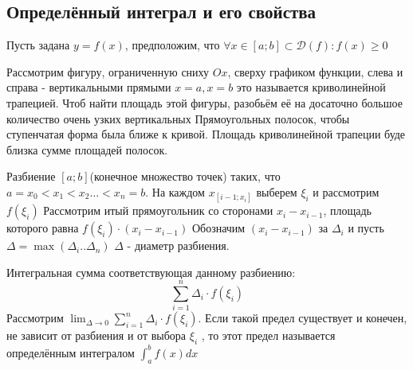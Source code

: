 \documentclass[oneside]{book}
\begin{document}
\begin{itemize}
\begin{enumerate}
\setcounter{chapter}{34} %
\chapter[Определённый интеграл]{Определённый интеграл и его свойства}
Пусть задана $y = f(x)$, предположим, что $\forall x \in [a;b] \subset \mathcal{D}(f): f(x) \geq 0$
\begin{center}
   {\pgfqpoint{-1pt}{-1pt}}%
   {\pgfqpoint{10pt}{10pt}}%
   {\pgfqpoint{9pt}{9pt}}%
   {
     \pgfsetlinewidth{0.4pt}
     \pgfpathmoveto{\pgfqpoint{0pt}{0pt}}
     \pgfpathlineto{\pgfqpoint{9.1pt}{9.1pt}}
    }
    \end{center}

Рассмотрим фигуру, ограниченную сниху $Ox$, сверху графиком функции, слева и справа - вертикальными прямыми
$x = a, x = b$ это называется криволинейной трапецией. Чтоб найти площадь этой фигуры, разобьём её на досаточно
большое количество очень узких вертикальных Прямоугольных полосок, чтобы ступенчатая форма была ближе к кривой. Площадь криволинейной
трапеции буде близка сумме площадей полосок.
\par Разбиение $[a;b]$(конечное множество точек) таких, что $a = x_0 <x_1 < x_2 \dots < x_n = b$. На каждом $x_{[i-1;x_i]}$
выберем $\xi_i$ и рассмотрим $f(\xi_i)$ Рассмотрим итый прямоугольник со сторонами $x_i - x_{i-1}$, площадь которого равна
$f(\xi_i)\cdot (x_i - x_{i-1})$ Обозначим $(x_i - x_{i-1})$ за $\Delta_i$ и пусть $\Delta = \max(\Delta_i .. \Delta_n)$
$\Delta$ - диаметр разбиения.
\par Интегральная сумма соответствующая данному разбиению: $$
  \sum_{i = 1}^n \Delta_i \cdot f(\xi_i)
$$
Рассмотрим $\lim_{\Delta \rightarrow 0}{\sum_{i = 1}^n \Delta_i \cdot f(\xi_i)} $. Если такой предел существует и конечен, не зависит от
разбиения и от выбора $\xi_i$ , то этот предел называется определённым интегралом $\int_{a}^b f(x) dx$



\end{enumerate}
\end{itemize}
\end{document}
